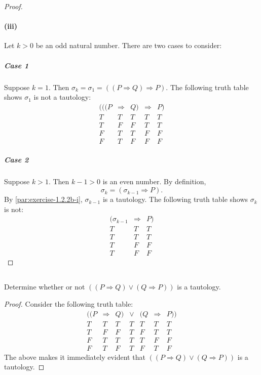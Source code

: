 \documentclass{report}
\begin{document}
\begin{proof}
    \paragraph{(iii)}%

      Let $k > 0$ be an odd natural number.
      There are two cases to consider:

      \subparagraph{Case 1}%

        Suppose $k = 1$.
        Then $\sigma_k = \sigma_1 = ((P \Rightarrow Q) \Rightarrow P)$.
        The following truth table shows $\sigma_1$ is not a tautology:
          $$\begin{array}{s|c|s|e|s}
            (((P & \Rightarrow & Q) & \Rightarrow & P) \\
            \hline
            T & T & T & T & T \\
            T & F & F & T & T \\
            F & T & T & F & F \\
            F & T & F & F & F
          \end{array}$$

      \subparagraph{Case 2}%

        Suppose $k > 1$.
        Then $k - 1 > 0$ is an even number.
        By definition, $$\sigma_k = (\sigma_{k-1} \Rightarrow P).$$
        By \eqref{par:exercise-1.2.2b-i}, $\sigma_{k-1}$ is a tautology.
        The following truth table shows $\sigma_k$ is not:
          $$\begin{array}{c|e|s}
            (\sigma_{k-1} & \Rightarrow & P) \\
            \hline
            T & T & T \\
            T & T & T \\
            T & F & F \\
            T & F & F
          \end{array}$$

  \end{proof}

\subsection{}%

  Determine whether or not $((P \Rightarrow Q) \lor (Q \Rightarrow P))$ is a
    tautology.

  \begin{proof}
    Consider the following truth table:
      $$\begin{array}{s|c|s|e|s|c|s}
        ((P & \Rightarrow & Q) & \lor & (Q & \Rightarrow & P)) \\
        \hline
        T & T & T & T & T & T & T \\
        T & F & F & T & F & T & T \\
        F & T & T & T & T & F & F \\
        F & T & F & T & F & T & F
      \end{array}$$
    The above makes it immediately evident that
      $((P \Rightarrow Q) \lor (Q \Rightarrow P))$ is a tautology.
  \end{proof}
\end{document}
